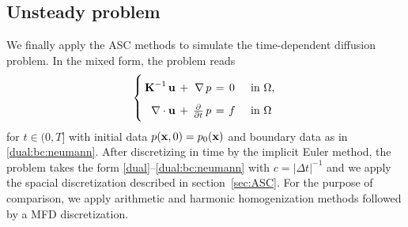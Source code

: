 \subsection{Unsteady problem}

We finally apply the ASC methods to simulate the time-dependent diffusion problem. In the mixed form, the problem reads
\begin{equation}\label{dual_transient}
	\arraycolsep=2pt\def\arraystretch{1.7}
	\left\{\begin{array}{rcrccl}
		\vect K^{-1}\,\vect u & + & \nabla\,p & = & 0 &\quad\text{in } \Omega , \\
		\nabla\cdot\vect u    & + & \frac{\partial}{\partial t}\,p      & = & f &\quad\text{in } \Omega
	\end{array}\right.
\end{equation}%
for $t\in(0, T]$ with initial data $p(\boldsymbol{\mathbf{x}}, 0) = p_0(\boldsymbol{\mathbf{x}})$ and boundary data as in \eqref{dual:bc:neumann}. After discretizing in time by the implicit Euler method, the problem takes the form \eqref{dual}--\eqref{dual:bc:neumann} with $c=|\Delta t|^{-1}$ and we apply the spacial discretization described in section~\ref{sec:ASC}. For the purpose of comparison, we apply arithmetic and harmonic homogenization methods followed by a MFD discretization.  



